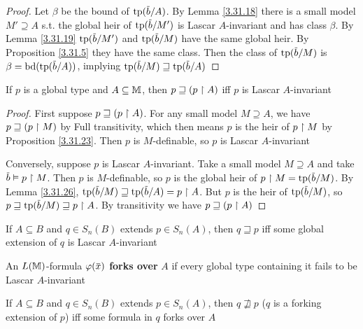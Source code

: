 \documentclass[11pt]{article}
\DeclareMathOperator{\tbd}{bd}
\begin{document}
\begin{proof}
Let \(\beta\) be the bound of \(\tp(\barb/A)\). By Lemma \ref{3.31.18} there is a small
model \(M'\supseteq A\) s.t. the global heir of \(\tp(\barb/M')\) is Lascar \(A\)-invariant and has
class \(\beta\). By Lemma \ref{3.31.19} \(\tp(\barb/M')\) and \(\tp(\barb/M)\) have the same global heir.
By Proposition \ref{3.31.5} they have the same class. Then the class of \(\tp(\barb/M)\)
is \(\beta=\tbd(\tp(\barb/A))\), implying \(\tp(\barb/M)\sqsupseteq\tp(\barb/A)\)
\end{proof}

\begin{proposition}
If \(p\) is a global type and \(A\subseteq\mathbb{M}\), then \(p\sqsupseteq(p\upharpoonright A)\) iff \(p\) is Lascar \(A\)-invariant
\end{proposition}

\begin{proof}
First suppose \(p\sqsupseteq(p\upharpoonright A)\). For any small model \(M\supseteq A\), we have \(p\sqsupseteq(p\upharpoonright M)\) by Full
transitivity, which then means \(p\) is the heir of \(p\upharpoonright M\) by Proposition \ref{3.31.23}.
Then \(p\) is \(M\)-definable, so \(p\) is Lascar \(A\)-invariant

Conversely, suppose \(p\) is Lascar \(A\)-invariant. Take a small model \(M\supseteq A\) and
take \(\barb\vDash p\uhr M\). Then \(p\) is \(M\)-definable, so \(p\) is the global heir
of \(p\uhr M=\tp(\barb/M)\). By Lemma \ref{3.31.26}, \(\tp(\barb/M)\sqsupseteq\tp(\barb/A)=p\uhr A\).
But \(p\) is the heir of \(\tp(\barb/M)\), so \(p\sqsupseteq\tp(\barb/M)\sqsupseteq p\uhr A\). By transitivity we
have \(p\sqsupseteq(p\upharpoonright A)\)
\end{proof}

\begin{corollary}[]
\label{3.31.28}
If \(A\subseteq B\) and \(q\in S_n(B)\) extends \(p\in S_n(A)\), then \(q\sqsupseteq p\) iff some global extension
of \(q\) is Lascar \(A\)-invariant
\end{corollary}

\begin{definition}[]
An \(L(\mathbb{M})\)-formula \(\varphi(\barx)\) \textbf{forks over} \(A\) if every global type containing it fails to be
Lascar \(A\)-invariant
\end{definition}

\begin{proposition}
If \(A\subseteq B\) and \(q\in S_n(B)\) extends \(p\in S_n(A)\), then \(q\not\sqsupseteq p\) (\(q\) is a forking
extension of \(p\)) iff some formula in \(q\)
forks over \(A\)
\end{proposition}
\end{document}
